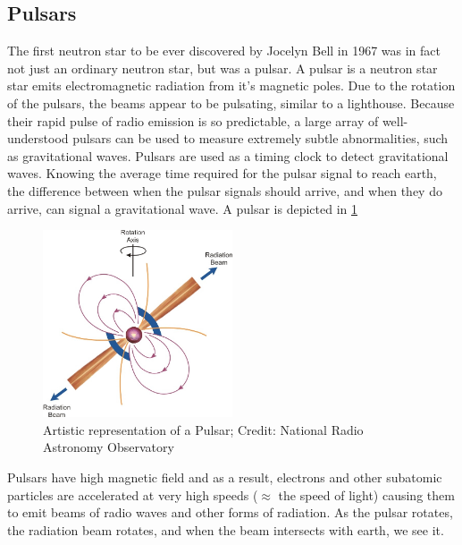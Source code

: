 \subsection{Pulsars}

The first neutron star to be ever discovered by Jocelyn Bell in 1967 was in fact not just an ordinary neutron star, but was a pulsar. A pulsar is a neutron star star emits electromagnetic radiation from it's magnetic poles. Due to the rotation of the pulsars, the beams appear to be pulsating, similar to a lighthouse. Because their rapid pulse of radio emission is so predictable, a large array of well-understood pulsars can be used to measure extremely subtle abnormalities, such as gravitational waves. Pulsars are used as a timing clock to detect gravitational waves. Knowing the average time required for the pulsar signal to reach earth, the difference between when the pulsar signals should arrive, and when they do arrive, can signal a gravitational wave. A pulsar is depicted in \cref{fig:pulsar_image1}

\begin{figure}[h]
\centering
\includegraphics[height=0.5\textwidth, width=0.5\textwidth]{images/pulsar.jpg}
\caption{\small Artistic representation of a Pulsar; Credit: National Radio Astronomy Observatory}
\label{fig:pulsar_image1}
\end{figure}

Pulsars have high magnetic field and as a result, electrons and other subatomic particles are accelerated at very high speeds ($\approx$ the speed of light) causing them to emit beams of radio waves and other forms of radiation. As the pulsar rotates, the radiation beam rotates, and when the beam intersects with earth, we see it.

